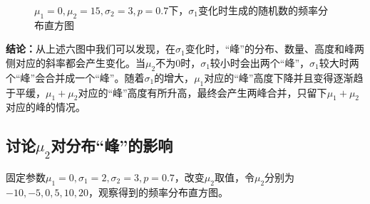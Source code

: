 \documentclass[CJK]{ctexart}
\begin{document}
\begin{figure}[H]
    \quad
    \caption{$\mu_1=0,\mu_2=15,\sigma_2=3,p=0.7$下，$\sigma_1$变化时生成的随机数的频率分布直方图}
    \label{fig2}
\end{figure}

\textbf{结论：}从上述六图中我们可以发现，在$\sigma_1$变化时，“峰”的分布、数量、高度和峰两侧对应的斜率都会产生变化。当$\mu_2$不为0时，$\sigma_1$较小时会出两个“峰”，$\sigma_1$较大时两个“峰”会合并成一个“峰”。随着$\sigma_1$的增大，$\mu_1$对应的“峰”高度下降并且变得逐渐趋于平缓，$\mu_1+\mu_2$对应的“峰”高度有所升高，最终会产生两峰合并，只留下$\mu_1+\mu_2$对应的峰的情况。

\subsection{讨论$\mu_2$对分布“峰”的影响}

固定参数$\mu_1=0,\sigma_1=2,\sigma_2=3,p=0.7$，改变$\mu_2$取值，令$\mu_2$分别为$-10,-5,0,5,10,20$，观察得到的频率分布直方图。
\end{document}
